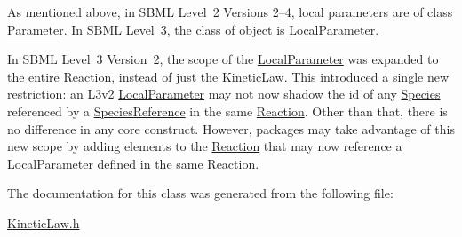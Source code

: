 As mentioned above, in S\+B\+ML Level~2 Versions 2--4, local parameters are of class \hyperlink{class_parameter}{Parameter}. In S\+B\+ML Level~3, the class of object is \hyperlink{class_local_parameter}{Local\+Parameter}.

In S\+B\+ML Level~3 Version~2, the scope of the \hyperlink{class_local_parameter}{Local\+Parameter} was expanded to the entire \hyperlink{class_reaction}{Reaction}, instead of just the \hyperlink{class_kinetic_law}{Kinetic\+Law}. This introduced a single new restriction\+: an L3v2 \hyperlink{class_local_parameter}{Local\+Parameter} may not now shadow the {\ttfamily id} of any \hyperlink{class_species}{Species} referenced by a \hyperlink{class_species_reference}{Species\+Reference} in the same \hyperlink{class_reaction}{Reaction}. Other than that, there is no difference in any core construct. However, packages may take advantage of this new scope by adding elements to the \hyperlink{class_reaction}{Reaction} that may now reference a \hyperlink{class_local_parameter}{Local\+Parameter} defined in the same \hyperlink{class_reaction}{Reaction}. 

The documentation for this class was generated from the following file\+:\begin{DoxyCompactItemize}
\item 
\hyperlink{_kinetic_law_8h}{Kinetic\+Law.\+h}\end{DoxyCompactItemize}
